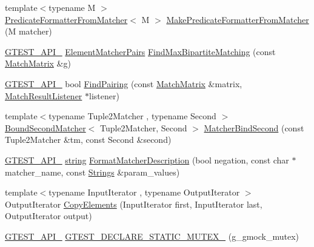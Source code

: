 \begin{DoxyCompactItemize}
\item 
{\footnotesize template$<$typename M $>$ }\\\hyperlink{classtesting_1_1internal_1_1_predicate_formatter_from_matcher}{Predicate\+Formatter\+From\+Matcher}$<$ M $>$ \hyperlink{namespacetesting_1_1internal_a3fd0f30ec03d577bba3e1aa13241e17d}{Make\+Predicate\+Formatter\+From\+Matcher} (M matcher)
\item 
\hyperlink{gtest-port_8h_aa73be6f0ba4a7456180a94904ce17790}{G\+T\+E\+S\+T\+\_\+\+A\+P\+I\+\_\+} \hyperlink{namespacetesting_1_1internal_a0038618710c01a71150887dc7cfb0a29}{Element\+Matcher\+Pairs} \hyperlink{namespacetesting_1_1internal_ae30bd8357c179334b2b09b0d689efccc}{Find\+Max\+Bipartite\+Matching} (const \hyperlink{classtesting_1_1internal_1_1_match_matrix}{Match\+Matrix} \&g)
\item 
\hyperlink{gtest-port_8h_aa73be6f0ba4a7456180a94904ce17790}{G\+T\+E\+S\+T\+\_\+\+A\+P\+I\+\_\+} bool \hyperlink{namespacetesting_1_1internal_af2bd2e350b56422a3d9d3b986ac1df0e}{Find\+Pairing} (const \hyperlink{classtesting_1_1internal_1_1_match_matrix}{Match\+Matrix} \&matrix, \hyperlink{classtesting_1_1_match_result_listener}{Match\+Result\+Listener} $\ast$listener)
\item 
{\footnotesize template$<$typename Tuple2\+Matcher , typename Second $>$ }\\\hyperlink{classtesting_1_1internal_1_1_bound_second_matcher}{Bound\+Second\+Matcher}$<$ Tuple2\+Matcher, Second $>$ \hyperlink{namespacetesting_1_1internal_a31eb77a2bb0ca713d6ef07d8a3b9af9e}{Matcher\+Bind\+Second} (const Tuple2\+Matcher \&tm, const Second \&second)
\item 
\hyperlink{gtest-port_8h_aa73be6f0ba4a7456180a94904ce17790}{G\+T\+E\+S\+T\+\_\+\+A\+P\+I\+\_\+} \hyperlink{namespacetesting_1_1internal_a8e8ff5b11e64078831112677156cb111}{string} \hyperlink{namespacetesting_1_1internal_a593b52fcbb46a765a31850661b1960f4}{Format\+Matcher\+Description} (bool negation, const char $\ast$matcher\+\_\+name, const \hyperlink{namespacetesting_1_1internal_a7706b17f05f4b49e351b052ae4e05073}{Strings} \&param\+\_\+values)
\item 
{\footnotesize template$<$typename Input\+Iterator , typename Output\+Iterator $>$ }\\Output\+Iterator \hyperlink{namespacetesting_1_1internal_a9372c12747bcf964aacb1284f8048cae}{Copy\+Elements} (Input\+Iterator first, Input\+Iterator last, Output\+Iterator output)
\item 
\hyperlink{gtest-port_8h_aa73be6f0ba4a7456180a94904ce17790}{G\+T\+E\+S\+T\+\_\+\+A\+P\+I\+\_\+} \hyperlink{namespacetesting_1_1internal_ae4d273e9b76b40a28483826518e68f17}{G\+T\+E\+S\+T\+\_\+\+D\+E\+C\+L\+A\+R\+E\+\_\+\+S\+T\+A\+T\+I\+C\+\_\+\+M\+U\+T\+E\+X\+\_\+} (g\+\_\+gmock\+\_\+mutex)

\end{DoxyCompactItemize}
